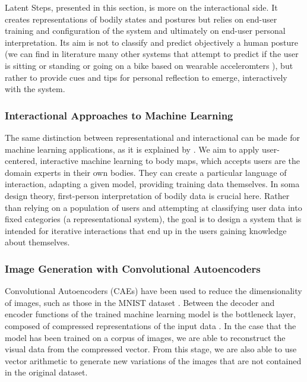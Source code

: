 Latent Steps, presented in this section, is more on the interactional side. It creates representations of bodily states and postures but relies on end-user training and configuration of the system and ultimately on end-user personal interpretation. Its aim is not to classify and predict objectively a human posture (we can find in literature many other systems that attempt to predict if the user is sitting or standing or going on a bike based on wearable acceleromters \cite{slim_survey_2019}), but rather to provide cues and tips for personal reflection to emerge, interactively with the system.

\subsubsection{Interactional Approaches to Machine Learning}

The same distinction between representational and interactional can be made for machine learning applications, as it is explained by \citeauthor{gillies_understanding_2019} \cite{gillies_understanding_2019} \cite{bishop_non-representational_2014}. We aim to apply user-centered, interactive machine learning to body maps, which accepts users are the domain experts in their own bodies. They can create a particular language of interaction, adapting a given model, providing training data themselves. In soma design theory, first-person interpretation of bodily data is crucial here. Rather than relying on a population of users and attempting at classifying user data into fixed categories (a representational system), the goal is to design a system that is intended for iterative interactions that end up in the users gaining knowledge about themselves.

\subsubsection{Image Generation with Convolutional Autoencoders}

Convolutional Autoencoders (CAEs) have been used to reduce the dimensionality of images, such as those in the MNIST dataset \cite{wang_auto-encoder_2016}. Between the decoder and encoder functions of the trained machine learning model is the bottleneck layer, composed of compressed representations of the input data \cite{zhang_better_nodate}. In the case that the model has been trained on a corpus of images, we are able to reconstruct the visual data from the compressed vector. From this stage, we are also able to use vector arithmetic to generate new variations of the images that are not contained in the original dataset.


